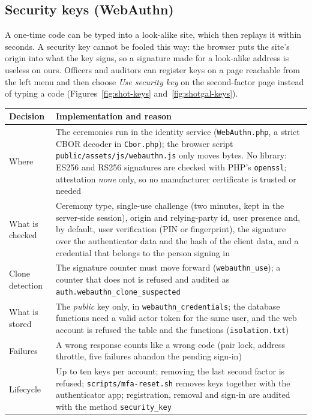 \documentclass[10pt,a4paper]{article}
\newcommand{\code}[1]{\nolinkurl{#1}}
\begin{document}
\subsection{Security keys (WebAuthn)}\label{sec:webauthn}
A one-time code can be typed into a look-alike site, which then replays it within seconds. A security key cannot be fooled this way: the browser puts the site's origin into what the key signs, so a signature made for a look-alike address is useless on ours. Officers and auditors can register keys on a page reachable from the left menu and then choose \emph{Use security key} on the second-factor page instead of typing a code (Figures~\ref{fig:shot-keys} and~\ref{fig:shotgal-keys}).
\begin{center}\small{}\label{tab:webauthndesign}
\begin{tabularx}{\linewidth}{@{}L{3.3cm}Y@{}}
\toprule\textbf{Decision} & \textbf{Implementation and reason}\\\midrule
Where & The ceremonies run in the identity service (\code{WebAuthn.php}, a strict CBOR decoder in \code{Cbor.php}); the browser script \code{public/assets/js/webauthn.js} only moves bytes. No library: ES256 and RS256 signatures are checked with PHP's \code{openssl}; attestation \emph{none} only, so no manufacturer certificate is trusted or needed\\
What is checked & Ceremony type, single-use challenge (two minutes, kept in the server-side session), origin and relying-party id, user presence and, by default, user verification (PIN or fingerprint), the signature over the authenticator data and the hash of the client data, and a credential that belongs to the person signing in\\
Clone detection & The signature counter must move forward (\code{webauthn\_use}); a counter that does not is refused and audited as \code{auth.webauthn\_clone\_suspected}\\
What is stored & The \emph{public} key only, in \code{webauthn\_credentials}; the database functions need a valid actor token for the same user, and the web account is refused the table and the functions (\code{isolation.txt})\\
Failures & A wrong response counts like a wrong code (pair lock, address throttle, five failures abandon the pending sign-in)\\
Lifecycle & Up to ten keys per account; removing the last second factor is refused; \code{scripts/mfa-reset.sh} removes keys together with the authenticator app; registration, removal and sign-in are audited with the method \code{security\_key}\\

\end{tabularx}
\end{center}
\end{document}
